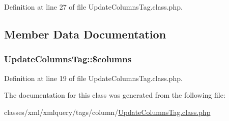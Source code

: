 Definition at line 27 of file Update\+Columns\+Tag.\+class.\+php.



\subsection{Member Data Documentation}
\subsubsection[{\texorpdfstring{\$columns}{$columns}}]{\setlength{\rightskip}{0pt plus 5cm}Update\+Columns\+Tag\+::\$columns}\hypertarget{classUpdateColumnsTag_aa406bc3dae4ef8fde8679bc97a6141b6}{}\label{classUpdateColumnsTag_aa406bc3dae4ef8fde8679bc97a6141b6}


Definition at line 19 of file Update\+Columns\+Tag.\+class.\+php.



The documentation for this class was generated from the following file\+:\begin{DoxyCompactItemize}
\item 
classes/xml/xmlquery/tags/column/\hyperlink{UpdateColumnsTag_8class_8php}{Update\+Columns\+Tag.\+class.\+php}\end{DoxyCompactItemize}
